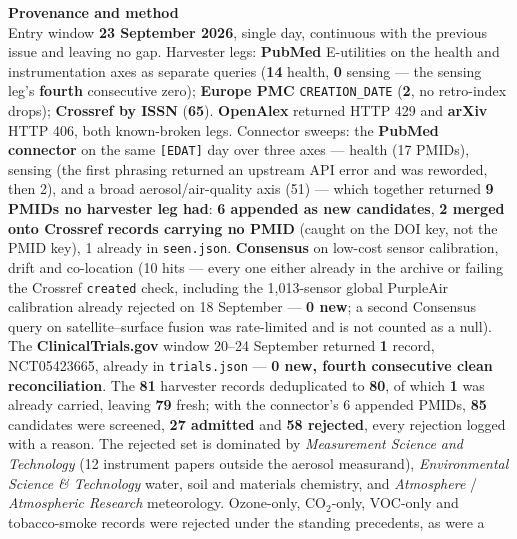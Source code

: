 \documentclass[10pt]{article}
\begin{document}


\vspace{2mm}

\begin{keybox}
{\sffamily\bfseries\footnotesize\color{Deep}Provenance and method}\\[1.2mm]
{\fontsize{7.2}{8.8}\selectfont
Entry window \textbf{23 September 2026}, single day, continuous with the previous issue and
leaving no gap. Harvester legs: \textbf{PubMed} E-utilities on the health and
instrumentation axes as separate queries (\textbf{14} health, \textbf{0} sensing --- the
sensing leg's \textbf{fourth} consecutive zero); \textbf{Europe PMC}
\texttt{CREATION\_DATE} (\textbf{2}, no retro-index drops); \textbf{Crossref by ISSN}
(\textbf{65}). \textbf{OpenAlex} returned HTTP 429 and \textbf{arXiv} HTTP 406, both
known-broken legs. Connector sweeps: the \textbf{PubMed connector} on the same
\texttt{[EDAT]} day over three axes --- health (17 PMIDs), sensing (the first phrasing
returned an upstream API error and was reworded, then 2), and a broad aerosol/air-quality
axis (51) --- which together returned \textbf{9 PMIDs no harvester leg had}: \textbf{6
appended as new candidates}, \textbf{2 merged onto Crossref records carrying no PMID}
(caught on the DOI key, not the PMID key), 1 already in \texttt{seen.json}.
\textbf{Consensus} on low-cost sensor calibration, drift and co-location (10 hits ---
every one either already in the archive or failing the Crossref \texttt{created} check,
including the 1,013-sensor global PurpleAir calibration already rejected on 18 September
--- \textbf{0 new}; a second Consensus query on satellite--surface fusion was rate-limited
and is not counted as a null). The \textbf{ClinicalTrials.gov} window 20--24 September
returned \textbf{1} record, NCT05423665, already in \texttt{trials.json} --- \textbf{0 new,
fourth consecutive clean reconciliation}.
The \textbf{81} harvester records deduplicated to \textbf{80}, of which \textbf{1} was
already carried, leaving \textbf{79} fresh; with the connector's 6 appended PMIDs,
\textbf{85} candidates were screened, \textbf{27 admitted} and \textbf{58 rejected}, every
rejection logged with a reason. The rejected set is dominated by \textit{Measurement
Science and Technology} (12 instrument papers outside the aerosol measurand),
\textit{Environmental Science \& Technology} water, soil and materials chemistry, and
\textit{Atmosphere} / \textit{Atmospheric Research} meteorology. Ozone-only, CO$_2$-only,
VOC-only and tobacco-smoke records were rejected under the standing precedents, as were a
}
\end{keybox}
\end{document}
